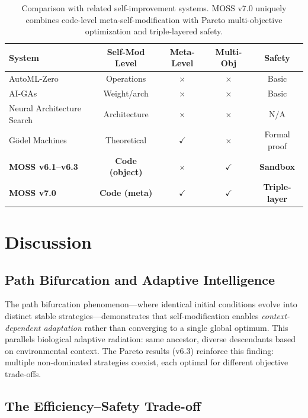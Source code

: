 \documentclass[11pt]{article}
\begin{document}
\begin{table}[h]
\centering
\small
\begin{tabular}{lcccc}
\toprule
\textbf{System} & \textbf{Self-Mod Level} & \textbf{Meta-Level} & \textbf{Multi-Obj} & \textbf{Safety} \\
\midrule
AutoML-Zero~\cite{real2020} & Operations & $\times$ & $\times$ & Basic \\
AI-GAs~\cite{clune2019} & Weight/arch & $\times$ & $\times$ & Basic \\
Neural Architecture Search & Architecture & $\times$ & $\times$ & N/A \\
G\"odel Machines~\cite{schmidhuber2003} & Theoretical & $\checkmark$ & $\times$ & Formal proof \\
\textbf{MOSS v6.1--v6.3} & \textbf{Code (object)} & $\times$ & \textbf{$\checkmark$} & \textbf{Sandbox} \\
\textbf{MOSS v7.0} & \textbf{Code (meta)} & $\checkmark$ & $\checkmark$ & \textbf{Triple-layer} \\
\bottomrule
\end{tabular}
\caption{Comparison with related self-improvement systems. MOSS v7.0 uniquely combines code-level meta-self-modification with Pareto multi-objective optimization and triple-layered safety.}
\label{tab:comparison}
\end{table}


\section{Discussion}

\subsection{Path Bifurcation and Adaptive Intelligence}

The path bifurcation phenomenon---where identical initial conditions evolve into distinct stable strategies---demonstrates that self-modification enables \textit{context-dependent adaptation} rather than converging to a single global optimum. This parallels biological adaptive radiation: same ancestor, diverse descendants based on environmental context. The Pareto results (v6.3) reinforce this finding: multiple non-dominated strategies coexist, each optimal for different objective trade-offs.

\subsection{The Efficiency--Safety Trade-off}
\end{document}
